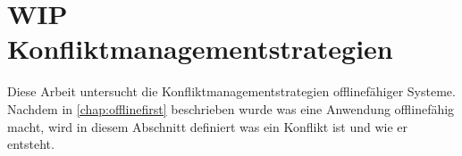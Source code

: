 %


%
%
\section{WIP Konfliktmanagementstrategien}
Diese Arbeit untersucht die Konfliktmanagementstrategien offlinefähiger Systeme. Nachdem in \autoref{chap:offlinefirst} beschrieben wurde was eine Anwendung offlinefähig macht, wird in diesem Abschnitt definiert was ein Konflikt ist und wie er entsteht.


